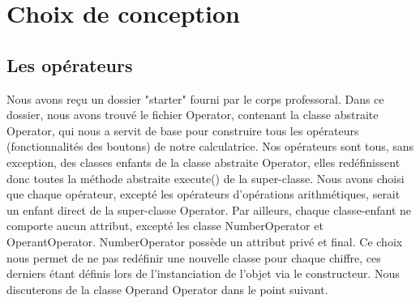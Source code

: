 \documentclass[12pt]{report}
\begin{document}
    \section*{Choix de conception}
        \subsection*{Les opérateurs}
            Nous avons reçu un dossier "starter" fourni par le corps professoral. Dans ce dossier, nous avons trouvé le
    fichier Operator, contenant la classe abstraite Operator, qui nous a servit de base pour construire tous les opérateurs (fonctionnalités des boutons) de notre
    calculatrice.
    \newline Nos opérateurs sont tous, sans exception, des classes enfants de la classe abstraite Operator, elles redéfinissent
    donc toutes la méthode abstraite execute() de la super-classe.
    Nous avons choisi que chaque opérateur, excepté les opérateurs d'opérations arithmétiques, serait un enfant direct de la
    super-classe Operator.
    \newline
    Par ailleurs, chaque classe-enfant ne comporte aucun attribut, excepté les classe NumberOperator et OperantOperator.
    NumberOperator possède un attribut privé et final. Ce choix nous permet de ne pas redéfinir une nouvelle classe pour chaque
    chiffre, ces derniers étant définis lors de l'instanciation de l'objet via le constructeur.
    \newline Nous discuterons de la classe Operand Operator dans le point suivant.
\end{document}
